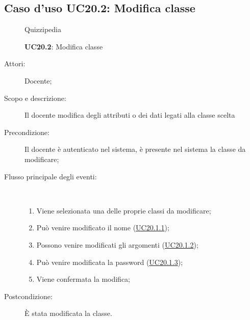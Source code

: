 \subsection{Caso d'uso UC20.2: Modifica classe}
	\begin{figure}[H]
		\centering
		\begin{resizedtikzpicture}{\textwidth}
		\begin{umlsystem}[x=0, fill=lightgray!20]{Quizzipedia}
		\end{umlsystem}
		\end{resizedtikzpicture}
		\caption{\textbf{UC20.2}: Modifica classe}
		\label{UC20.2}
	\end{figure}
\begin{description}
\item[Attori:] Docente;
\item[Scopo e descrizione:] Il docente modifica degli attributi o dei dati legati alla classe scelta
      \item[Precondizione:] Il docente è autenticato nel sistema, è presente nel sistema la classe da modificare;

        \item[Flusso principale degli eventi:] \ 
 \begin{enumerate}
          \item Viene selezionata una delle proprie classi da modificare;
          \item Può venire modificato il nome (\hyperlink{UC20.1.1}{UC20.1.1});
          \item Possono venire modificati gli argomenti (\hyperlink{UC20.1.2}{UC20.1.2});
          \item Può venire modificata la password (\hyperlink{UC20.1.3}{UC20.1.3});
          \item Viene confermata la modifica;

      \end{enumerate}
    \item[Postcondizione:] È stata modificata la classe.
  \end{description}
\hypertarget{UC20.3}{}
